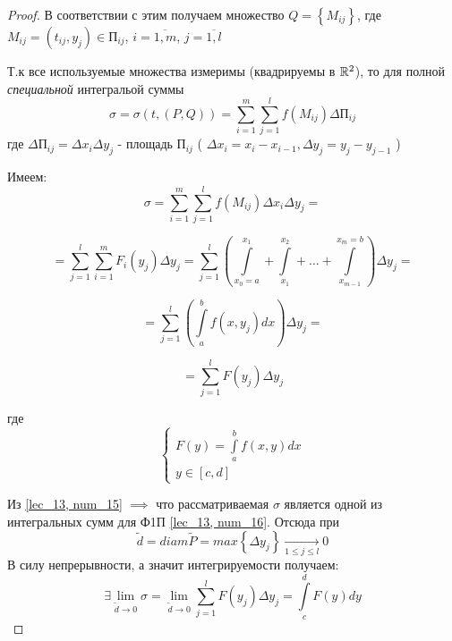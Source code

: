 \documentclass[../../main.tex]{subfiles}
\begin{document}
\begin{proof}
 	В соответствии с этим получаем множество $ Q = \left\lbrace M_{ij} \right\rbrace $,
 	где $ M_{ij} = \left( t_{ij}, y_j \right) \in \text{П}_{ij} $, $ i = \overline{1, m} $, 
 	$ j = \overline{1, l} $
 	
 	Т.к все используемые множества измеримы (квадрируемы в $ \mathbb{R}^2 $), 
 	то для полной \emph{специальной} интегральой суммы
 	\begin{equation}
 	\label{lec_13, num_14}
 	\sigma = \sigma \left( t, \left( P, Q \right) \right) = \sum\limits_{i = 1}^m 
 	\sum\limits_{j = 1}^l f \left( M_{ij} \right) \Delta \text{П}_{ij}
 	\end{equation}
 	где $\Delta \text{П}_{ij} = \Delta x_i \Delta y_j$ - площадь $\text{П}_{ij}$ 
 	( $ \Delta x_i = x_i - x_{i-1}, \Delta y_j = y_j - y_{j - 1} $ )
 	
 	Имеем:
 	\[ \sigma = \sum\limits_{i = 1}^m \sum\limits_{j = 1}^l f \left( M_{ij} \right) 
 	\Delta x_i \Delta y_j = \]
 	
 	\[ = \sum\limits_{j = 1}^l \sum\limits_{i = 1}^m F_i \left( y_j \right) \Delta y_j = 
 	\sum\limits_{j = 1}^l \left( 
 	\int\limits_{x_0 = a}^{ x_1 } + \int\limits_{x_1}^{ x_2 } + \dots + 
 	\int\limits_{ x_{m-1} }^{x_m = b} \right) \Delta y_j = \]
 	
 	\[ = \sum\limits_{j = 1}^l \left( \int\limits_a^b f \left( x, y_j\right) dx \right)
 	 \Delta y_j =  \]
 	
 	\begin{equation}
 	\label{lec_13, num_15}
 	= \sum\limits_{j = 1}^l F \left( y_j \right) \Delta y_j 
 	\end{equation}
 	
 	где
 	\begin{equation}
 	\label{lec_13, num_16}
 	\begin{cases}
 	F \left( y \right) = \int\limits_a^b f \left( x, y \right) dx \\
 	y \in \left[ c, d \right] 
 	\end{cases}
 	\end{equation}
 	
 	Из \eqref{lec_13, num_15} $ \implies $ что рассматриваемая $\sigma$
 	является одной из интегральных сумм для Ф1П  \eqref{lec_13, num_16}.
 	Отсюда при 
 	\[ \widetilde{d} = diam \widetilde{P} = 
 	max \left\lbrace \Delta y_j \right\rbrace \underset{1 \leq j \leq l}{\longrightarrow} 0 \]
 	В силу непрерывности, а значит интегрируемости получаем: 
 	\[ \exists \lim\limits_{ \widetilde{d} \to 0 } \sigma = 
 	\lim\limits_{ \widetilde{d} \to 0 } \sum\limits_{j = 1}^l F \left( y_j \right) \Delta y_j =
 	\int\limits_c^d F \left( y \right)dy  \]
 	

\end{proof}
\end{document}
